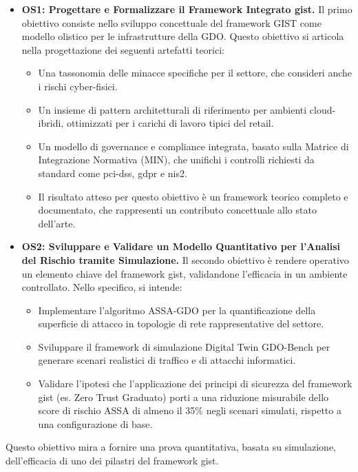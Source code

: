 \begin{itemize}
    \item \textbf{OS1: Progettare e Formalizzare il Framework Integrato \gls{gist}.}
    Il primo obiettivo consiste nello sviluppo concettuale del framework GIST come modello olistico per le infrastrutture della GDO. Questo obiettivo si articola nella progettazione dei seguenti artefatti teorici:   
    \begin{itemize}
        \item Una tassonomia delle minacce specifiche per il settore, che consideri anche i rischi cyber-fisici.
        \item Un insieme di pattern architetturali di riferimento per ambienti cloud-ibridi, ottimizzati per i carichi di lavoro tipici del retail.
        \item Un modello di governance e compliance integrata, basato sulla Matrice di Integrazione Normativa (MIN), che unifichi i controlli richiesti da standard come \gls{pci-dss}, \gls{gdpr} e \gls{nis2}.
        \item Il risultato atteso per questo obiettivo è un framework teorico completo e documentato, che rappresenti un contributo concettuale allo stato dell'arte.
        \end{itemize}
    \item \textbf{OS2: Sviluppare e Validare un Modello Quantitativo per l'Analisi del Rischio tramite Simulazione.}
    Il secondo obiettivo è rendere operativo un elemento chiave del framework \gls{gist}, validandone l'efficacia in un ambiente controllato. Nello specifico, si intende:

    \begin{itemize}
        \item Implementare l'algoritmo ASSA-GDO per la quantificazione della superficie di attacco in topologie di rete rappresentative del settore.

           \item Sviluppare il framework di simulazione Digital Twin GDO-Bench per generare scenari realistici di traffico e di attacchi informatici.
        
           \item Validare l'ipotesi che l'applicazione dei principi di sicurezza del framework \gls{gist} (es. Zero Trust Graduato) porti a una riduzione misurabile dello score di rischio ASSA di almeno il 35\% negli scenari simulati, rispetto a una configurazione di base.
        \end{itemize}
    
\end{itemize}
Questo obiettivo mira a fornire una prova quantitativa, basata su simulazione, dell'efficacia di uno dei pilastri del framework \gls{gist}.

